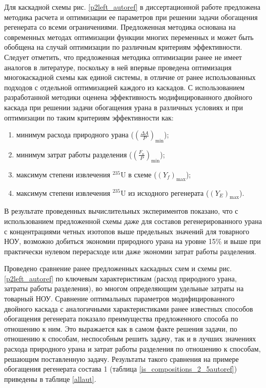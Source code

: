 Для каскадной схемы рис. \ref{p2left_autoref} в диссертационной работе предложена методика расчета и оптимизации ее параметров при решении задачи обогащения регенерата со всеми ограничениями. Предложенная методика основана на современных методах оптимизации функции многих переменных и может быть обобщена на случай оптимизации по различным критериям эффективности. Следует отметить, что предложенная методика оптимизации ранее не имеет аналогов в литературе, поскольку в ней впервые проведена оптимизация многокаскадной схемы как единой системы, в отличие от ранее использованных подходов с отдельной оптимизацией каждого из каскадов. С использованием разработанной методики оценена эффективность модифицированного двойного каскада при решении задачи обогащения урана в различных условиях и при оптимизации по таким критериям эффективности как:

\begin{enumerate}
  \item минимум расхода природного урана ($(\frac{\Delta A}{P})_\text{min}$);
  \item минимум затрат работы разделения ($(\frac{F_n}{P})_\text{min}$);
  \item максимум степени извлечения $^{235}$U в схеме ($(Y_f)_\text{max}$);
  \item максимум степени извлечения $^{235}$U из исходного регенерата ($(Y_{E})_\text{max}$).
\end{enumerate}  

В результате проведенных вычислительных экспериментов показано, что с использованием предложенной схемы даже для составов регенерированного урана с концентрациями четных изотопов выше предельных значений для товарного НОУ, возможно добиться экономии природного урана на уровне 15\% и выше при практически нулевом перерасходе или даже экономии затрат работы разделения. 

Проведено сравнение ранее предложенных каскадных схем и схемы рис. \ref{p2left_autoref} по ключевым характеристикам (расход природного урана, затраты работы разделения), во многом определяющим удельные затраты на товарный НОУ. Сравнение оптимальных параметров модифицированного двойного каскада с аналогичными характеристиками ранее известных способов обогащения регенерата показало преимущества предложенного способа по отношению к ним. Это выражается как в самом факте решения задачи, по отношению к способам, неспособным решить задачу, так и в лучших значениях расхода природного урана и затрат работы разделения по отношению к способам, решающим поставленную задачу. Результаты такого сравнения на примере обогащения регенерата состава 1 (таблица \ref{is_compositions_2_5autoref}) приведены в таблице \ref{allaut}. 

